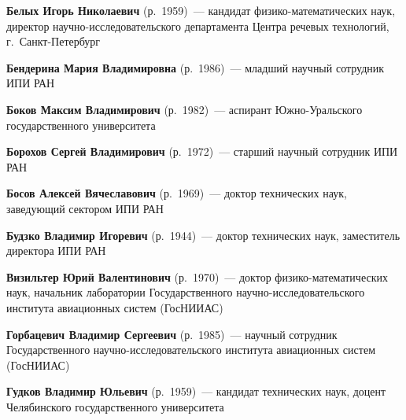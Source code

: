 \begin{multicols}{2}


\noindent
\textbf{Белых Игорь Николаевич} (р.\ 1959)~--- 
кандидат фи\-зи\-ко-математических наук, директор 
научно-ис\-сле\-до\-ва\-тель\-ско\-го департамента Центра речевых технологий, 
г.~Санкт-Пе\-тер\-бург

\vspace*{6pt}

\noindent
\textbf{Бендерина Мария Владимировна} (р.\ 1986)~--- младший научный сотрудник ИПИ РАН

\vspace*{6pt}


\noindent
\textbf{Боков Максим Владимирович} (р.\ 1982)~--- 
аспирант Южно-Уральского государственного университета

\vspace*{6pt}

\noindent
\textbf{Борохов Сергей Владимирович} (р.\ 1972)~--- старший научный сотрудник ИПИ РАН

\vspace*{6pt}

\noindent
\textbf{Босов Алексей Вячеславович} (р.\ 1969)~--- доктор технических наук, заведующий
сектором ИПИ РАН

\vspace*{6pt}

\noindent
\textbf{Будзко Владимир Игоревич} (р.\ 1944)~--- 
доктор технических наук, заместитель директора ИПИ РАН

\vspace*{6pt}

\noindent
\textbf{Визильтер Юрий Валентинович} (р.\ 1970)~--- 
доктор фи\-зи\-ко-математических наук, начальник лаборатории Государственного 
научно-исследовательского института авиационных систем (ГосНИИАС)

\vspace*{6pt}

\noindent
\textbf{Горбацевич Владимир Сергеевич} (р.\ 1985)~--- 
научный сотрудник Государственного научно-ис\-сле\-до\-ва\-тель\-ско\-го 
института авиационных систем (ГосНИИАС)

\vspace*{6pt}

\noindent
\textbf{Гудков Владимир Юльевич} (р.\ 1959)~---  кандидат технических наук,
доцент  Челябинского государственного университета


\end{multicols}
